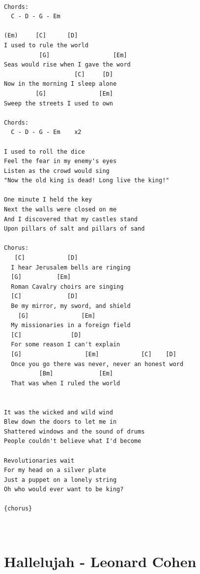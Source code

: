 \documentclass[
]{book}
\let\stdsection\section
\renewcommand\section{\clearpage\stdsection}
\begin{document}
\begin{verbatim}

Chords:
  C - D - G - Em 

(Em)     [C]      [D]
I used to rule the world
          [G]                  [Em]
Seas would rise when I gave the word
                    [C]     [D]
Now in the morning I sleep alone    
         [G]               [Em]
Sweep the streets I used to own

Chords:
  C - D - G - Em    x2

I used to roll the dice 
Feel the fear in my enemy's eyes 
Listen as the crowd would sing 
"Now the old king is dead! Long live the king!" 

One minute I held the key 
Next the walls were closed on me 
And I discovered that my castles stand 
Upon pillars of salt and pillars of sand 

Chorus:
   [C]            [D]
  I hear Jerusalem bells are ringing
  [G]          [Em]
  Roman Cavalry choirs are singing
  [C]             [D]
  Be my mirror, my sword, and shield
    [G]               [Em]
  My missionaries in a foreign field
  [C]              [D]
  For some reason I can't explain
  [G]                  [Em]            [C]    [D]
  Once you go there was never, never an honest word
          [Bm]             [Em]
  That was when I ruled the world
  

It was the wicked and wild wind 
Blew down the doors to let me in 
Shattered windows and the sound of drums 
People couldn't believe what I'd become 

Revolutionaries wait 
For my head on a silver plate 
Just a puppet on a lonely string 
Oh who would ever want to be king? 

{chorus}



\end{verbatim}

\hypertarget{hallelujah---leonard-cohen}{%
\section{Hallelujah - Leonard Cohen}\label{hallelujah---leonard-cohen}}
\end{document}
